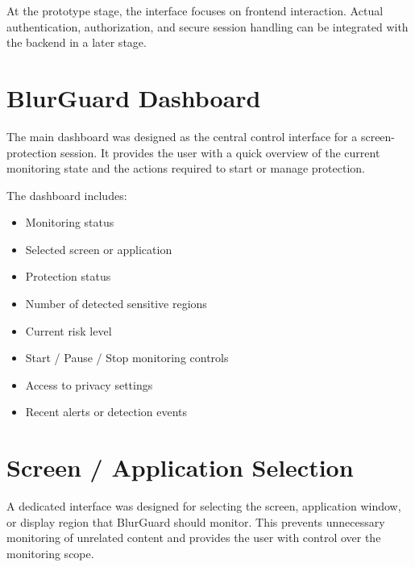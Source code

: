 \documentclass[12pt,a4paper]{article}
\begin{document}
At the prototype stage, the interface focuses on frontend interaction. Actual authentication,
authorization, and secure session handling can be integrated with the backend in a later stage.


\section{BlurGuard Dashboard}

The main dashboard was designed as the central control interface for a screen-protection
session. It provides the user with a quick overview of the current monitoring state and
the actions required to start or manage protection.

The dashboard includes:

\begin{itemize}

    \item Monitoring status

    \item Selected screen or application

    \item Protection status

    \item Number of detected sensitive regions

    \item Current risk level

    \item Start / Pause / Stop monitoring controls

    \item Access to privacy settings

    \item Recent alerts or detection events

\end{itemize}


\section{Screen / Application Selection}

A dedicated interface was designed for selecting the screen, application window, or
display region that BlurGuard should monitor. This prevents unnecessary monitoring
of unrelated content and provides the user with control over the monitoring scope.
\end{document}
